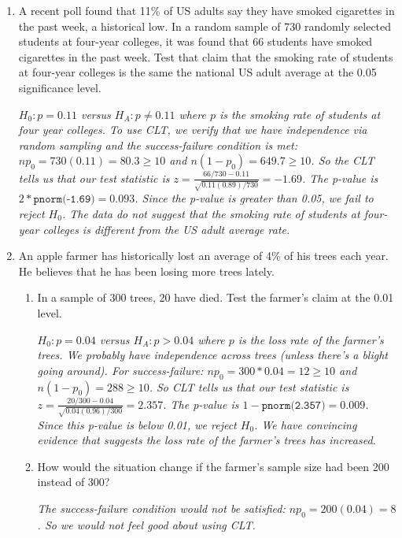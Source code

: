 \documentclass[12pt]{article}   	%
\newcommand{\soln}[2]{\textit{\textcolor{custom_red}{#2}}}{}
\begin{document}
\begin{enumerate}
\item
  A recent poll found that 11\% of US adults say they have smoked
  cigarettes in the past week, a historical low. In a random sample of
  730 randomly selected students at four-year colleges, it was found
  that 66 students have smoked cigarettes in the past week. Test that
  claim that the smoking rate of students at four-year colleges is the
  same the national US adult average at the 0.05 significance level.
  
  \soln{}{$H_{0}: p = 0.11$ versus $H_{A}: p \neq 0.11$ where $p$ is the smoking rate of students at four year colleges. To use CLT, we verify that we have independence via random sampling and the success-failure condition is met: $np_0 = 730(0.11)= 80.3 \geq 10$ and $n(1-p_{0}) = 649.7 \geq 10$. So the CLT tells us that our test statistic is $z = \frac{66/730 - 0.11}{\sqrt{0.11(0.89)/730}} = -1.69$. The p-value is $2*\texttt{pnorm(-1.69)} = 0.093$. Since the p-value is greater than 0.05, we fail to reject $H_{0}$. The data do not suggest that the smoking rate of students at four-year colleges is different from the US adult average rate.}
  
\item
  An apple farmer has historically lost an average of 4\% of his trees
  each year. He believes that he has been losing more trees lately.

  \begin{enumerate}
  \def\labelenumii{\alph{enumii}.}
  \item
    In a sample of 300 trees, 20 have died. Test the farmer's claim at
    the 0.01 level.
    
    \soln{}{$H_{0}: p = 0.04$ versus $H_{A}: p > 0.04$ where $p$ is the loss rate of the farmer's trees. We probably have independence across trees (unless there's a blight going around). For success-failure: $np_{0} = 300*0.04 = 12 \geq 10$ and $n(1-p_{0}) = 288 \geq 10$. So CLT  tells us that our test statistic is $z = \frac{20/300 - 0.04}{\sqrt{0.04(0.96)/300}} = 2.357$. The p-value is $1-\texttt{pnorm(2.357)} = 0.009$. Since this p-value is below 0.01, we reject $H_{0}$. We have convincing evidence that suggests the loss rate of the farmer's trees has increased.}
  \item
    How would the situation change if the farmer's sample size had been
    200 instead of 300?
    
    \soln{}{The success-failure condition would not be satisfied: $np_{0} = 200(0.04) = 8$. So we would not feel good about using CLT.}
  \end{enumerate}
\end{enumerate}
\end{document}
